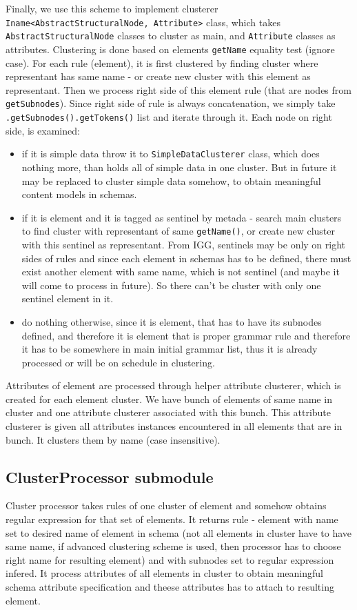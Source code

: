 \documentclass[a4paper,10pt,oneside]{article}
\newcommand{\code}[1]{\texttt{#1}}
\begin{document}
Finally, we use this scheme to implement clusterer \code{Iname<AbstractStructuralNode, Attribute>} class, which takes \code{AbstractStructuralNode} classes to cluster as main, and \code{Attribute} classes as attributes.
Clustering is done based on elements \code{getName} equality test (ignore case).
For each rule (element), it is first clustered by finding cluster where representant has same name - or create new cluster with this element as representant.
Then we process right side of this element rule (that are nodes from \code{getSubnodes}).
Since right side of rule is always concatenation, we simply take \code{.getSubnodes().getTokens()} list and iterate through it.
Each node on right side, is examined:
\begin{itemize}
  \item if it is simple data throw it to \code{SimpleDataClusterer} class, which does nothing more, than holds all of simple data in one cluster. But in future it may be replaced to cluster simple data somehow, to obtain meaningful content models in schemas.
  \item if it is element and it is tagged as sentinel by metada - search main clusters to find cluster with representant of same \code{getName()}, or create new cluster with this sentinel as representant. From IGG, sentinels may be only on right sides of rules and since each element in schemas has to be defined, there must exist another element with same name, which is not sentinel (and maybe it will come to process in future). So there can't be cluster with only one sentinel element in it.
  \item do nothing otherwise, since it is element, that has to have its subnodes defined, and therefore it is element that is proper grammar rule and therefore it has to be somewhere in main initial grammar list, thus it is already processed or will be on schedule in clustering.
\end{itemize}
Attributes of element are processed through helper attribute clusterer, which is created for each element cluster.
We have bunch of elements of same name in cluster and one attribute clusterer associated with this bunch.
This attribute clusterer is given all attributes instances encountered in all elements that are in bunch.
It clusters them by name (case insensitive).

\subsection{ClusterProcessor submodule}
Cluster processor takes rules of one cluster of element and somehow obtains regular expression for that set of elements. It returns rule - element with name set to desired name of element in schema (not all elements in cluster have to have same name, if advanced clustering scheme is used, then processor has to choose right name for  resulting element) and with subnodes set to regular expression infered.
It process attributes of all elements in cluster to obtain meaningful schema attribute specification and theese attributes has to attach to resulting element.
\end{document}
